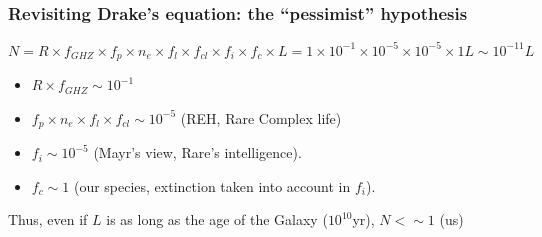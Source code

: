 % 


\begin{frame}
\frametitle{Revisiting Drake's equation: the ``pessimist'' hypothesis}
%
%
$$
N = R \times f_{GHZ} \times f_p \times n_e \times f_l \times f_{cl} \times f_i   \times f_c \times L = 1 \times 10^{-1} \times 10^{-5} \times10^{-5}  \times 1 L \sim  10^{-11} L
$$
 \begin{itemize}
\item $R  \times f_{GHZ}  \sim 10^{-1}$
\item $f_p \times n_e \times f_l \times f_{cl} \sim 10^{-5} $ (REH, Rare Complex life)
\item $f_i \sim 10^{-5}$ (Mayr's view, Rare's intelligence).
\item $f_{c}\sim  1$ (our species, extinction taken into account in $f_i$). 
\end{itemize}

\begin{block}{}

Thus, even if $L$ is as long as the age of the Galaxy ($10^{10}$yr), $N < \sim 1$ (us)
\end{block}

\end{frame}


